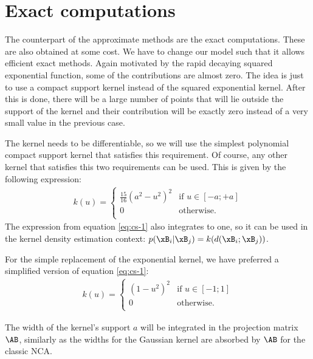 	
	
\section{Exact computations}
\label{sec:exact-computations}

	The counterpart of the approximate methods are the exact computations. These are
	also obtained at some cost. We have to change our model such that it allows
	efficient exact methods. Again motivated by the rapid decaying squared
	exponential function, some of the contributions are almost zero. The idea is
	just to use a compact support kernel instead of the squared exponential kernel.
	After this is done, there will be a large number of points that will lie outside
	the support of the kernel and their contribution will be exactly zero instead of
	a very small value in the previous case.
	
	The kernel needs to be differentiable, so we will use the simplest polynomial
	compact support kernel that satisfies this requirement. Of course, any other
	kernel that satisfies this two requirements can be used. This is given by the
	following expression:
	\begin{align}
		k(u)=\begin{cases}
			\frac{15}{16}(a^2-u^2)^2& \mbox{if } u \in [-a;+a]\\
			0& \mbox{otherwise}.\\
		\end{cases}
		\label{eq:cs-1}
	\end{align}
	The expression from equation \ref{eq:cs-1} also integrates to one, so it can be
	used in the kernel density estimation context: $p(\xB_i|\xB_j) =
	k(d(\xB_i;\xB_j))$. 
	
	For the simple replacement of the exponential kernel, we have preferred a
	simplified version of equation \ref{eq:cs-1}: 
		\begin{align}
			k(u)=\begin{cases}
					(1-u^2)^2& \mbox{if } u \in [-1;1]\\
					0& \mbox{otherwise}.\\
				\end{cases}
				\label{eq:cs-2}
		\end{align}
		
		The width of the kernel's support $a$ will be integrated in the projection
	matrix $\AB$, similarly as the widths for the Gaussian kernel are absorbed by
	$\AB$ for the classic NCA.
	
